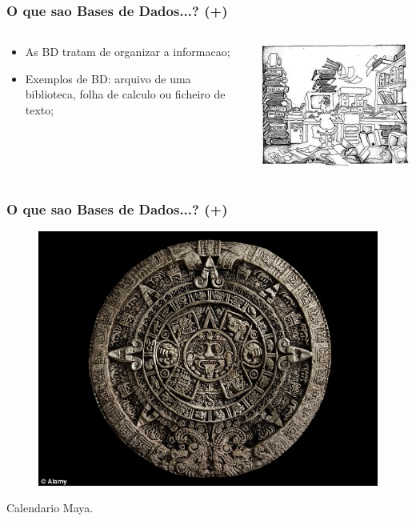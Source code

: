 \documentclass[hyperref={pdfpagelabels=true}]{beamer}
\begin{document}
\begin{frame}
\frametitle{O que sao Bases de Dados...? (+)}
\begin{columns}
  \begin{column}{7cm}
    \begin{itemize}
      \item<2-> As BD tratam de organizar a informacao;
      \item<3-> Exemplos de BD: arquivo de uma biblioteca, folha de calculo ou ficheiro de texto;
    \end{itemize}
  \end{column}
  \begin{column}{10cm}
    \includegraphics[scale=0.4]{informationoverloadcartoon.jpg}
  \end{column}  
\end{columns}
\end{frame}

\begin{frame}
\frametitle{O que sao Bases de Dados...? (+)}
\begin{overprint}
\begin{figure}
\includegraphics[scale=0.4]{mayas.jpg}
\end{figure}
Calendario Maya.\\
\end{overprint}
\end{frame}
\end{document}
